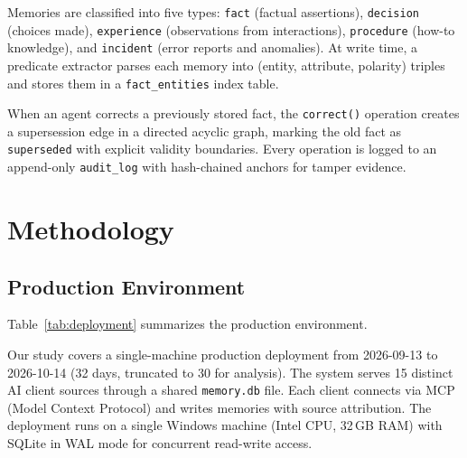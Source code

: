 \documentclass[11pt]{article}
\begin{document}
Memories are classified into five types: \texttt{fact} (factual assertions), \texttt{decision} (choices made), \texttt{experience} (observations from interactions), \texttt{procedure} (how-to knowledge), and \texttt{incident} (error reports and anomalies). At write time, a predicate extractor parses each memory into (entity, attribute, polarity) triples and stores them in a \texttt{fact\_entities} index table.

When an agent corrects a previously stored fact, the \texttt{correct()} operation creates a supersession edge in a directed acyclic graph, marking the old fact as \texttt{superseded} with explicit validity boundaries. Every operation is logged to an append-only \texttt{audit\_log} with hash-chained anchors for tamper evidence.

\section{Methodology}
\label{sec:methodology}

\subsection{Production Environment}

Table~\ref{tab:deployment} summarizes the production environment.

Our study covers a single-machine production deployment from 2026-09-13 to 2026-10-14 (32 days, truncated to 30 for analysis). The system serves 15 distinct AI client sources through a shared \texttt{memory.db} file. Each client connects via MCP (Model Context Protocol) and writes memories with source attribution. The deployment runs on a single Windows machine (Intel CPU, 32\,GB RAM) with SQLite in WAL mode for concurrent read-write access.
\end{document}
